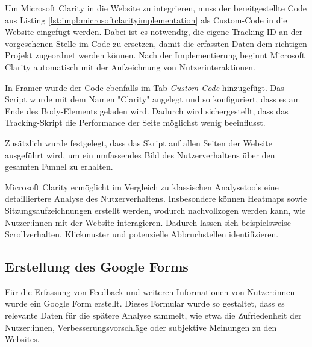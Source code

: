 Um Microsoft Clarity in die Website zu integrieren, muss der 
bereitgestellte Code aus Listing \ref{lst:impl:microsoftclarityimplementation} 
als Custom-Code in die Website eingefügt werden. 
Dabei ist es notwendig, die eigene Tracking-ID an der vorgesehenen 
Stelle im Code zu ersetzen, damit die erfassten Daten dem richtigen 
Projekt zugeordnet werden können. Nach der Implementierung beginnt 
Microsoft Clarity automatisch mit der Aufzeichnung von 
Nutzerinteraktionen.

In Framer wurde der Code ebenfalls im Tab \textit{Custom Code} 
hinzugefügt. Das Script wurde mit dem Namen "Clarity" 
angelegt und so konfiguriert, dass es am Ende des Body-Elements 
geladen wird. Dadurch wird sichergestellt, dass das Tracking-Skript 
die Performance der Seite möglichst wenig beeinflusst.

Zusätzlich wurde festgelegt, dass das Skript auf allen Seiten der 
Website ausgeführt wird, um ein umfassendes Bild des 
Nutzerverhaltens über den gesamten Funnel zu erhalten.

Microsoft Clarity ermöglicht im Vergleich zu klassischen 
Analysetools eine detailliertere Analyse des Nutzerverhaltens. 
Insbesondere können Heatmaps sowie Sitzungsaufzeichnungen erstellt 
werden, wodurch nachvollzogen werden kann, wie Nutzer:innen mit der 
Website interagieren. Dadurch lassen sich beispielsweise 
Scrollverhalten, Klickmuster und potenzielle Abbruchstellen identifizieren.

\subsection{Erstellung des Google Forms}

Für die Erfassung von Feedback und weiteren Informationen von 
Nutzer:innen wurde ein Google Form erstellt. Dieses Formular wurde 
so gestaltet, dass es relevante Daten für die spätere Analyse 
sammelt, wie etwa die Zufriedenheit der Nutzer:innen, 
Verbesserungsvorschläge oder subjektive Meinungen zu den
Websites.

